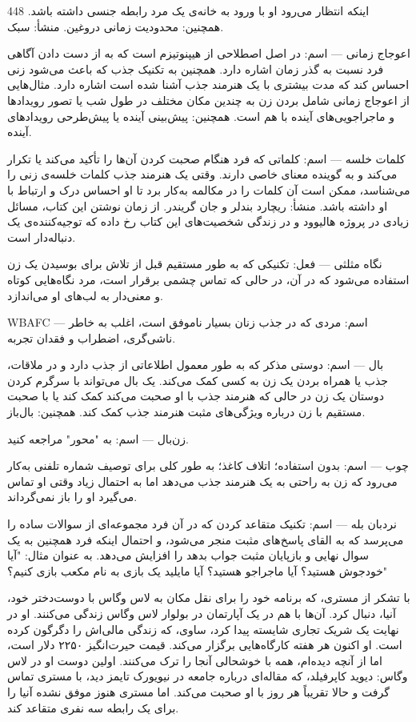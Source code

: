 448
اینکه انتظار می‌رود او با ورود به خانه‌ی یک مرد رابطه جنسی داشته باشد. همچنین: محدودیت زمانی دروغین. منشأ: سبک.

اعوجاج زمانی — اسم: در اصل اصطلاحی از هیپنوتیزم است که به از دست دادن آگاهی فرد نسبت به گذر زمان اشاره دارد. همچنین به تکنیک جذب که باعث می‌شود زنی احساس کند که مدت بیشتری با یک هنرمند جذب آشنا شده است اشاره دارد. مثال‌هایی از اعوجاج زمانی شامل بردن زن به چندین مکان مختلف در طول شب یا تصور رویدادها و ماجراجویی‌های آینده با هم است. همچنین: پیش‌بینی آینده یا پیش‌طرحی رویدادهای آینده.

کلمات خلسه — اسم: کلماتی که فرد هنگام صحبت کردن آن‌ها را تأکید می‌کند یا تکرار می‌کند و به گوینده معنای خاصی دارند. وقتی یک هنرمند جذب کلمات خلسه‌ی زنی را می‌شناسد، ممکن است آن کلمات را در مکالمه به‌کار برد تا او احساس درک و ارتباط با او داشته باشد. منشأ: ریچارد بندلر و جان گریندر. از زمان نوشتن این کتاب، مسائل زیادی در پروژه هالیوود و در زندگی شخصیت‌های این کتاب رخ داده که توجیه‌کننده‌ی یک دنباله‌دار است.

نگاه مثلثی — فعل: تکنیکی که به طور مستقیم قبل از تلاش برای بوسیدن یک زن استفاده می‌شود که در آن، در حالی که تماس چشمی برقرار است، مرد نگاه‌هایی کوتاه و معنی‌دار به لب‌های او می‌اندازد.

WBAFC — اسم: مردی که در جذب زنان بسیار ناموفق است، اغلب به خاطر ناشی‌گری، اضطراب و فقدان تجربه.

بال — اسم: دوستی مذکر که به طور معمول اطلاعاتی از جذب دارد و در ملاقات، جذب یا همراه بردن یک زن به کسی کمک می‌کند. یک بال می‌تواند با سرگرم کردن دوستان یک زن در حالی که هنرمند جذب با او صحبت می‌کند کمک کند یا با صحبت مستقیم با زن درباره ویژگی‌های مثبت هنرمند جذب کمک کند. همچنین: بال‌باز.

زن‌بال — اسم: به "محور" مراجعه کنید.

چوب — اسم: بدون استفاده؛ اتلاف کاغذ؛ به طور کلی برای توصیف شماره تلفنی به‌کار می‌رود که زن به راحتی به یک هنرمند جذب می‌دهد اما به احتمال زیاد وقتی او تماس می‌گیرد او را باز نمی‌گرداند.

نردبان بله — اسم: تکنیک متقاعد کردن که در آن فرد مجموعه‌ای از سوالات ساده را می‌پرسد که به القای پاسخ‌های مثبت منجر می‌شود، و احتمال اینکه فرد همچنین به یک سوال نهایی و بازپایان مثبت جواب بدهد را افزایش می‌دهد. به عنوان مثال: "آیا خودجوش هستید؟ آیا ماجراجو هستید؟ آیا مایلید یک بازی به نام مکعب بازی کنیم؟"

با تشکر از مستری، که برنامه خود را برای نقل مکان به لاس وگاس با دوست‌دختر خود، آنیا، دنبال کرد. آن‌ها با هم در یک آپارتمان در بولوار لاس وگاس زندگی می‌کنند. او در نهایت یک شریک تجاری شایسته پیدا کرد، ساوی، که زندگی مالی‌اش را دگرگون کرده است. او اکنون هر هفته کارگاه‌هایی برگزار می‌کند. قیمت حیرت‌انگیز ۲۲۵۰ دلار است، اما از آنچه دیده‌ام، همه با خوشحالی آنجا را ترک می‌کنند. اولین دوست او در لاس وگاس: دیوید کاپرفیلد، که مقاله‌ای درباره جامعه در نیویورک تایمز دید، با مستری تماس گرفت و حالا تقریباً هر روز با او صحبت می‌کند. اما مستری هنوز موفق نشده آنیا را برای یک رابطه سه نفری متقاعد کند.

